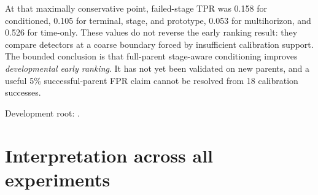 \documentclass[11pt,a4paper]{article}
\begin{document}
At that maximally conservative point, failed-stage TPR was 0.158 for
conditioned, 0.105 for terminal, stage, and prototype, 0.053 for
multihorizon, and 0.526 for time-only. These values do not reverse the early
ranking result: they compare detectors at a coarse boundary forced by
insufficient calibration support. The bounded conclusion is that full-parent
stage-aware conditioning improves \emph{developmental early ranking}. It has
not yet been validated on new parents, and a useful 5\% successful-parent FPR
claim cannot be resolved from 18 calibration successes.

Development root:
.

\section{Interpretation across all experiments}
\end{document}
